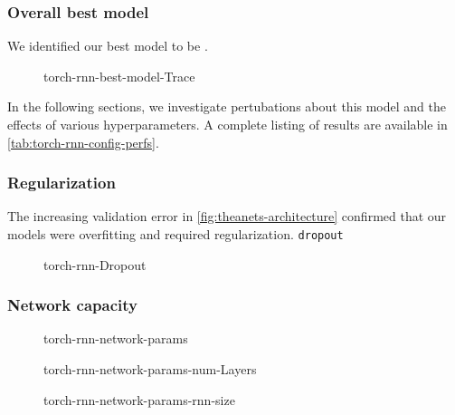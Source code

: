 \subsubsection{Overall best model}

We identified our best model to be .

\begin{figure}[tb]
  \centering
  
  \caption{torch-rnn-best-model-Trace}
  \label{fig:torch-rnn-best-model-trace}
\end{figure}

In the following sections, we investigate pertubations about this model and the
effects of various hyperparameters. A complete listing of results are available
in \cref{tab:torch-rnn-config-perfs}.

\subsubsection{Regularization}

The increasing validation error in \cref{fig:theanets-architecture} confirmed
that our models were overfitting and required regularization. \texttt{dropout}

\begin{figure}[tb]
  \centering
  
  \caption{torch-rnn-Dropout}
  \label{fig:torch-rnn-dropout}
\end{figure}


\subsubsection{Network capacity}

\begin{figure}[tb]
    \centering
  
    \caption{torch-rnn-network-params}
    \label{fig:torch-rnn-network-params}
\end{figure}

\begin{figure}[tb]
  \centering
  
  \caption{torch-rnn-network-params-num-Layers}
  \label{fig:torch-rnn-network-params-num-layers}
\end{figure}

\begin{figure}[tb]
  \centering
  
  \caption{torch-rnn-network-params-rnn-size}
  \label{fig:torch-rnn-network-params-rnn-size}
\end{figure}

